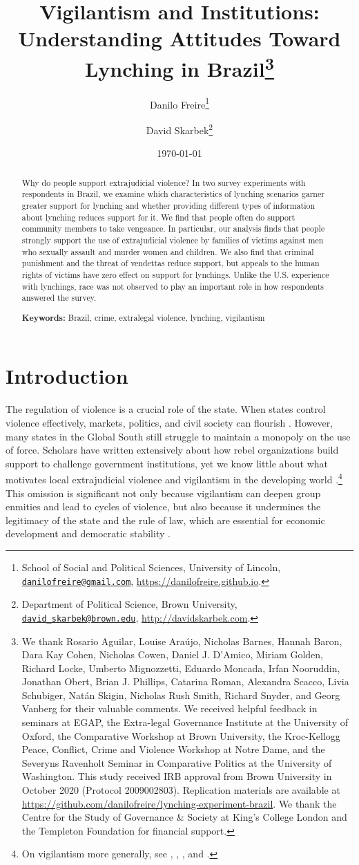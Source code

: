 \documentclass[12pt,a4paper]{article}
\title{Vigilantism and Institutions:\\ Understanding Attitudes Toward Lynching in Brazil\footnote{We thank Rosario Aguilar, Louise Araújo, Nicholas Barnes, Hannah Baron, Dara Kay Cohen, Nicholas Cowen, Daniel J. D'Amico, Miriam Golden, Richard Locke, Umberto Mignozzetti, Eduardo Moncada, Irfan Nooruddin, Jonathan Obert, Brian J. Phillips, Catarina Roman, Alexandra Scacco, Livia Schubiger, Natán Skigin, Nicholas Rush Smith, Richard Snyder, and Georg Vanberg for their valuable comments. We received helpful feedback in seminars at EGAP, the Extra-legal Governance Institute at the University of Oxford, the Comparative Workshop at Brown University, the Kroc-Kellogg Peace, Conflict, Crime and Violence Workshop at Notre Dame, and the Severyns Ravenholt Seminar in Comparative Politics at the University of Washington. This study received IRB approval from Brown University in October 2020 (Protocol 2009002803). Replication materials are available at \url{https://github.com/danilofreire/lynching-experiment-brazil}. We thank the Centre for the Study of Governance \& Society at King's College London and the Templeton Foundation for financial support.}}
\author{Danilo Freire\footnote{School of Social and Political Sciences, University of Lincoln, \href{mailto:danilofreire@gmail.com}{\texttt{danilofreire@gmail.com}}, \url{https://danilofreire.github.io}.} \and David Skarbek\footnote{Department of Political Science, Brown University, \href{mailto:david_skarbek@brown.edu}{\texttt{david\_skarbek@brown.edu}}, \url{http://davidskarbek.com}.}}
\date{\today}
\begin{document}
\maketitle

\begin{abstract}
\doublespacing \noindent Why do people support extrajudicial violence? In two survey experiments with respondents in Brazil, we examine which characteristics of lynching scenarios garner greater support for lynching and whether providing different types of information about lynching reduces support for it. We find that people often do support community members to take vengeance. In particular, our analysis finds that people strongly support the use of extrajudicial violence by families of victims against men who sexually assault and murder women and children. We also find that criminal punishment and the threat of vendettas reduce support, but appeals to the human rights of victims have zero effect on support for lynchings. Unlike the U.S. experience with lynchings, race was not observed to play an important role in how respondents answered the survey.
\vspace{.25cm}

\noindent \textbf{Keywords:} Brazil, crime, extralegal violence, lynching, vigilantism
\vspace{.25cm}

\end{abstract}

\newpage

\section*{Introduction}
\label{sec:introduction}

\doublespacing

The regulation of violence is a crucial role of the state. When states control
violence effectively, markets, politics, and civil society can flourish
\citep{besley2011pillars, north2009violence}. However, many states in the
Global South still struggle to maintain a monopoly on the use of force.
Scholars have written extensively about how rebel organizations build support
to challenge government institutions, yet we know little about what motivates
local extrajudicial violence and vigilantism in the developing world
\citep{bateson2020politics}.\footnote{On vigilantism more generally, see
\citet{cohen2022collective}, \citet{schuberth2013challenging},
\citet{smith2019contradictions}, and \citet{zizumbo2017community}.} This
omission is significant not only because vigilantism can deepen group enmities
and lead to cycles of violence, but also because it undermines the legitimacy
of the state and the rule of law, which are essential for economic development
and democratic stability \citep{jung2020lynching, tankebe2009self}.
\end{document}
